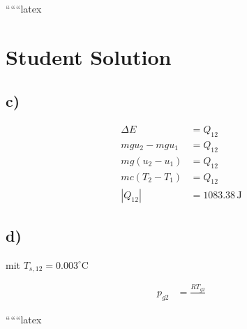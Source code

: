 ``````latex

\section*{Student Solution}

\subsection*{c)}

\begin{align*}
\Delta E &= Q_{12} \\
m g u_2 - m g u_1 &= Q_{12} \\
m g (u_2 - u_1) &= Q_{12} \\
m c (T_2 - T_1) &= Q_{12} \\
|Q_{12}| &= 1083.38 \, \text{J}
\end{align*}

\subsection*{d)}

mit $T_{s,12} = 0.003^\circ \text{C}$

\begin{align*}
p_{g2} &= \frac{R T_{g2}}{}
\end{align*}

``````latex


